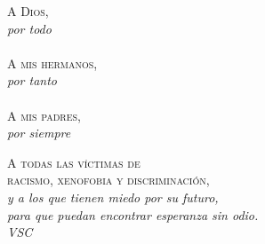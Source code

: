 \pagestyle{empty}

\begin{flushright}
\textsc{A Dios,} \hspace{1cm} ${}$\\
\textit{por todo}\\
\textit{ }\\
\textsc{A mis hermanos,} \hspace{1.2cm} ${}$\\
\textit{por tanto}\\
\textit{ }\\
\textsc{A mis padres,} \hspace{1.6cm} ${}$\\
\textit{por siempre}\\
\textit{ }
\end{flushright}
\vspace{9cm}
\begin{center}
\textsc{A todas las víctimas de}\\
\textsc{racismo, xenofobia y discriminación,}\\
\textit{y a los que tienen miedo por su futuro,}\\
\textit{para que puedan encontrar esperanza sin odio.}\\
\vspace{0.5cm}
\textit{VSC}
\end{center}